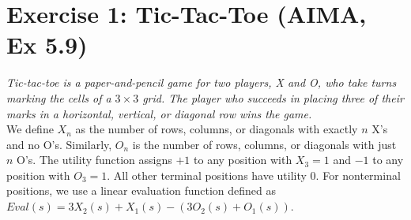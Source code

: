 \documentclass[9pt,a4paper]{extarticle}
\begin{document}
   \section*{Exercise 1: Tic-Tac-Toe (AIMA, Ex 5.9)}
   \textit{Tic-tac-toe is a paper-and-pencil game for two players, X and O, who take turns marking the cells of a $3\times 3$ grid. The player who succeeds in placing three of their marks in a horizontal, vertical, or diagonal row wins the game.}\\
   We define $X_n$ as the number of rows, columns, or diagonals with exactly $n$ X's and no O's. Similarly, $O_n$ is the number of rows, columns, or diagonals
with just $n$ O's. The utility function assigns $+1$ to any position with $X_3 = 1$ and $-1$ to any
position with $O_3 = 1$. All other terminal positions have utility 0. For nonterminal positions,
we use a linear evaluation function defined as $Eval(s) = 3X_2(s)+X_1(s)-(3O_2(s)+O_1(s))$.\\
\end{document}
